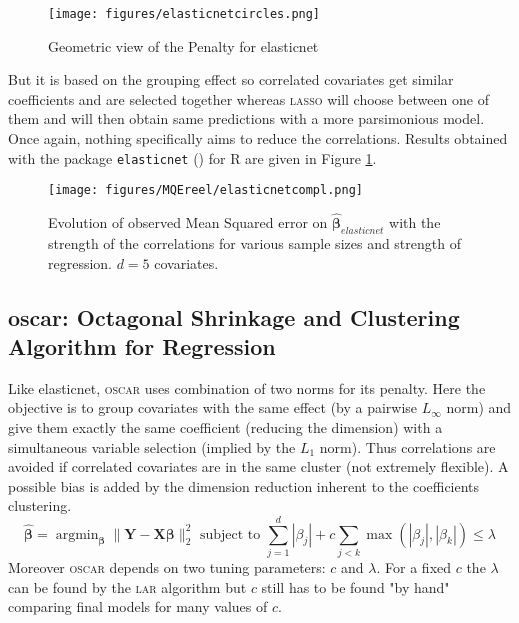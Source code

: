 \documentclass[12pt,a4paper]{report}
\begin{document}
	
	\begin{figure}[h!]
			\centering
			\texttt{[image: figures/elasticnetcircles.png]} 
			\caption{Geometric view of the Penalty for elasticnet}
		\end{figure}	
	
	But it is based on the grouping effect so correlated covariates get similar coefficients and are selected together whereas \textsc{lasso} will choose between one of them and will then obtain same predictions with a more parsimonious model. Once again, nothing specifically aims to reduce the correlations. Results obtained with the package {\tt elasticnet} (\cite{packageelasticnet}) for R are given in Figure \ref{MQEelasticnetcompl}.

	
	 \begin{figure}
	 \centering
	  \texttt{[image: figures/MQEreel/elasticnetcompl.png]}
	  \caption{Evolution of observed Mean Squared error on $\hat{\boldsymbol{\beta}}_{elasticnet}$ with the strength of the correlations for various sample sizes and strength of regression. $d=5$ covariates. } \label{MQEelasticnetcompl}
	\end{figure}
		
		 \FloatBarrier

		\subsection{{\sc oscar}: Octagonal Shrinkage and Clustering Algorithm for Regression }		%

			Like elasticnet, \textsc{oscar} \cite{bondell2008simultaneous} uses combination of two norms for its penalty. Here the objective is to group covariates with the same effect (by a pairwise $L_\infty$ norm) and give them exactly the same coefficient (reducing the dimension) with a simultaneous variable selection (implied by the $L_1$ norm). Thus correlations are avoided if correlated covariates are in the same cluster (not extremely flexible). A possible bias is added by the dimension reduction inherent to the coefficients clustering.
			\begin{equation}
				\hat{\boldsymbol{\beta}}=\operatorname{argmin}_{\boldsymbol{\beta}} \parallel\boldsymbol{Y}-\boldsymbol{X}\boldsymbol{\beta} \parallel^2_2 \textrm{ subject to } \sum_{j=1}^d|\beta_j|+c\sum_{j<k}\operatorname{max}(|\beta_j|,|\beta_k|) \leq \lambda		
			\end{equation}						
			Moreover \textsc{oscar} depends on two tuning parameters: $c$ and $\lambda$. For a fixed $c$ the $\lambda$ can be found by the \textsc{lar} algorithm but $c$ still has to be found "by hand" comparing final models for many values of $c$.
			
\end{document}
